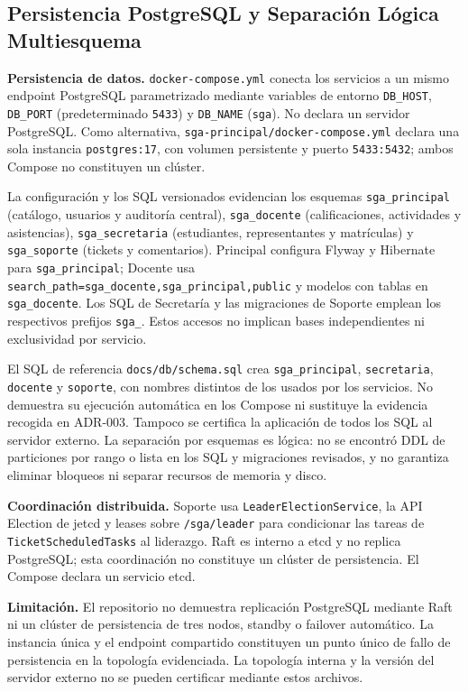 \documentclass[11pt,a4paper]{article}
\begin{document}
\subsection{Persistencia PostgreSQL y Separaci\'on L\'ogica Multiesquema}
\textbf{Persistencia de datos.} \texttt{docker-compose.yml} conecta los servicios a un mismo endpoint PostgreSQL parametrizado mediante variables de entorno \texttt{DB\_HOST}, \texttt{DB\_PORT} (predeterminado \texttt{5433}) y \texttt{DB\_NAME} (\texttt{sga}). No declara un servidor PostgreSQL. Como alternativa, \texttt{sga-principal/docker-compose.yml} declara una sola instancia \texttt{postgres:17}, con volumen persistente y puerto \texttt{5433:5432}; ambos Compose no constituyen un cl\'uster.

La configuraci\'on y los SQL versionados evidencian los esquemas \texttt{sga\_principal} (cat\'alogo, usuarios y auditor\'ia central), \texttt{sga\_docente} (calificaciones, actividades y asistencias), \texttt{sga\_secretaria} (estudiantes, representantes y matr\'iculas) y \texttt{sga\_soporte} (tickets y comentarios). Principal configura Flyway y Hibernate para \texttt{sga\_principal}; Docente usa \texttt{search\_path=sga\_docente,sga\_principal,public} y modelos con tablas en \texttt{sga\_docente}. Los SQL de Secretar\'ia y las migraciones de Soporte emplean los respectivos prefijos \texttt{sga\_}. Estos accesos no implican bases independientes ni exclusividad por servicio.

El SQL de referencia \texttt{docs/db/schema.sql} crea \texttt{sga\_principal}, \texttt{secretaria}, \texttt{docente} y \texttt{soporte}, con nombres distintos de los usados por los servicios. No demuestra su ejecuci\'on autom\'atica en los Compose ni sustituye la evidencia recogida en ADR-003. Tampoco se certifica la aplicaci\'on de todos los SQL al servidor externo. La separaci\'on por esquemas es l\'ogica: no se encontr\'o DDL de particiones por rango o lista en los SQL y migraciones revisados, y no garantiza eliminar bloqueos ni separar recursos de memoria y disco.

\textbf{Coordinaci\'on distribuida.} Soporte usa \texttt{LeaderElectionService}, la API Election de jetcd y leases sobre \texttt{/sga/leader} para condicionar las tareas de \texttt{TicketScheduledTasks} al liderazgo. Raft es interno a etcd y no replica PostgreSQL; esta coordinaci\'on no constituye un cl\'uster de persistencia. El Compose declara un servicio etcd.

\textbf{Limitaci\'on.} El repositorio no demuestra replicaci\'on PostgreSQL mediante Raft ni un cl\'uster de persistencia de tres nodos, standby o failover autom\'atico. La instancia \'unica y el endpoint compartido constituyen un punto \'unico de fallo de persistencia en la topolog\'ia evidenciada. La topolog\'ia interna y la versi\'on del servidor externo no se pueden certificar mediante estos archivos.
\end{document}
